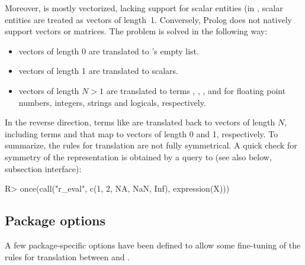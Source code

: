 \documentclass[article]{jss}
\begin{document}
Moreover,  is mostly vectorized, lacking support for scalar
entities (in , scalar entities are treated as vectors of length\ 1.
Conversely, Prolog does not natively support vectors or matrices. The problem is
solved in the following way: 

\begin{itemize}
\item {} vectors of length 0 are translated to 's
  empty list.
\item {} vectors of length 1 are translated to 
  scalars.
\item {} vectors of length $N > 1$ are translated to 
  terms , , , and  for floating
  point numbers, integers, strings and logicals, respectively.
\end{itemize}

In the reverse direction,  terms like  are
translated back to  vectors of length $N$, including 
terms  and  that map to  vectors of
length 0 and 1, respectively. To summarize, the rules for translation are not
fully symmetrical. A quick check for symmetry of the representation is obtained
by a query to  (see also below, subsection  
interface):

\begin{Schunk}
\begin{Sinput}
R> once(call("r_eval", c(1, 2, NA, NaN, Inf), expression(X)))
\end{Sinput}
\end{Schunk}

\subsection{Package options}

A few package-specific options have been defined to allow some fine-tuning of
the rules for translation between  and .
\end{document}
